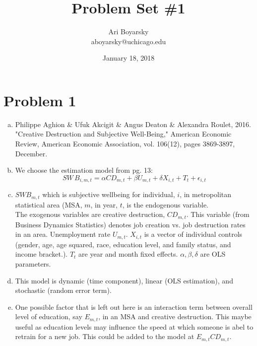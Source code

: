 \documentclass[dvips,12pt]{article}
\begin{document}

\title{Problem Set \#1}
\author{Ari Boyarsky \\ aboyarsky@uchicago.edu}
\date{January 18, 2018}


\maketitle


\section*{Problem 1}
\begin{enumerate}[a.]
	\item Philippe Aghion \& Ufuk Akcigit \& Angus Deaton \& Alexandra Roulet, 2016. "Creative Destruction and Subjective Well-Being," American Economic Review, American Economic Association, vol. 106(12), pages 3869-3897, December.

	\item We choose the estimation model from pg. 13:
	$$SW\,B_{i,m,t} = \alpha C D_{m,t} + \beta U_{m,t} + \delta X_{i,t} + T_t + \epsilon_{i,t}$$

	\item $SW B_{m,t}$ which is subjective wellbeing for individual, $i$, in metropolitan statistical area (MSA, $m$, in year, $t$, is the endogenous variable.
	\vspace{10pt} 
	\\ The exogenous variables are creative destruction, $CD_{m,t}$. This variable (from Business Dynamics Statistics) denotes job creation vs. job destruction rates in an area. Unemployment rate $U_{m,t}$. $X_{i,t}$ is a vector of individual controls (gender, age, age squared, race, education level, and family status, and income bracket.). $T_t$ are year and month fixed effects. $\alpha, \beta, \delta$ are OLS parameters.

	\item This model is dynamic (time component), linear (OLS estimation), and stochastic (random error term).

	\item One possible factor that is left out here is an interaction term between overall level of education, say $E_{m,t}$, in an MSA and creative destruction. This maybe useful as education levels may influence the speed at which someone is abel to retrain for a new job. This could be added to the model at $E_{m,t}C D_{m,t}$.
\end{enumerate}
\end{document}
